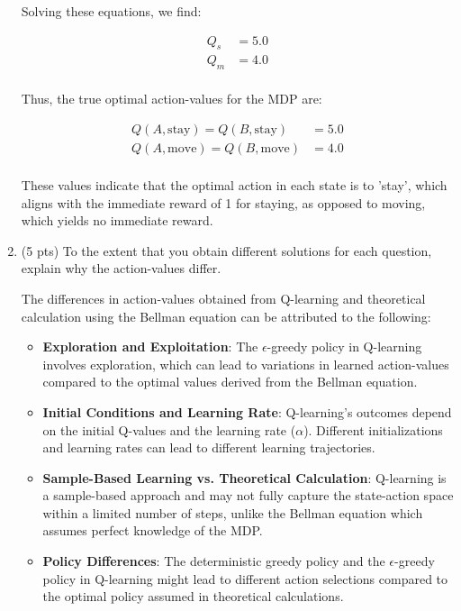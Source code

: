 \documentclass[a4paper]{article}
\theoremstyle{definition}
\newenvironment{soln}{
    \leavevmode\color{blue}\ignorespaces
}{}
\begin{document}
\begin{enumerate}
\begin{soln}
    Solving these equations, we find:

    \begin{align*}
    Q_s &= 5.0 \\
    Q_m &= 4.0 \\
    \end{align*}

    Thus, the true optimal action-values for the MDP are:

    \begin{align*}
    Q(A, \text{stay}) = Q(B, \text{stay}) &= 5.0 \\
    Q(A, \text{move}) = Q(B, \text{move}) &= 4.0 \\
    \end{align*}

    These values indicate that the optimal action in each state is to 'stay', which aligns with the immediate reward of 1 for staying, as opposed to moving, which yields no immediate reward.
\end{soln}


\item (5 pts) To the extent that you obtain different solutions for each question, explain why the action-values  differ. \\
\begin{soln}
    The differences in action-values obtained from Q-learning and theoretical calculation using the Bellman equation can be attributed to the following:

    \begin{itemize}
    \item \textbf{Exploration and Exploitation}: The \(\epsilon\)-greedy policy in Q-learning involves exploration, which can lead to variations in learned action-values compared to the optimal values derived from the Bellman equation.

    \item \textbf{Initial Conditions and Learning Rate}: Q-learning's outcomes depend on the initial Q-values and the learning rate (\(\alpha\)). Different initializations and learning rates can lead to different learning trajectories.

    \item \textbf{Sample-Based Learning vs. Theoretical Calculation}: Q-learning is a sample-based approach and may not fully capture the state-action space within a limited number of steps, unlike the Bellman equation which assumes perfect knowledge of the MDP.

    \item \textbf{Policy Differences}: The deterministic greedy policy and the \(\epsilon\)-greedy policy in Q-learning might lead to different action selections compared to the optimal policy assumed in theoretical calculations.


\end{itemize}
\end{soln}
\end{enumerate}
\end{document}
